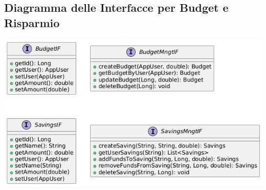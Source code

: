 \subsection{Diagramma delle Interfacce per Budget e Risparmio}
\hspace{1pt}
\begin{center}
    \includegraphics[scale=0.5]{images/InterfaceUML-iterazione3.png}
\end{center}
